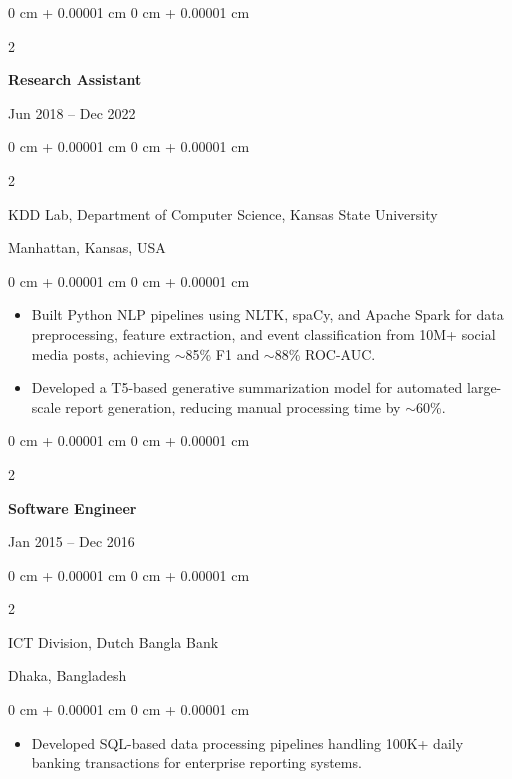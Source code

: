 \documentclass[10pt, letterpaper]{article}
\newenvironment{highlights}{
    \begin{itemize}[
        topsep=0.10 cm,
        parsep=0.10 cm,
        partopsep=0pt,
        itemsep=0pt,
        leftmargin=0 cm + 10pt
    ]
}{
    \end{itemize}
} %
\newenvironment{onecolentry}{
    \begin{adjustwidth}{
        0 cm + 0.00001 cm
    }{
        0 cm + 0.00001 cm
    }
}{
    \end{adjustwidth}
} %
\newenvironment{twocolentry}[2][]{
    \onecolentry
    \def\secondColumn{#2}
    \setcolumnwidth{\fill, 4.5 cm}
    \begin{paracol}{2}
}{
    \switchcolumn \raggedleft \secondColumn
    \end{paracol}
    \endonecolentry
} %
\begin{document}
    \vspace{1mm}

    \begin{twocolentry}{Jun 2018 -- Dec 2022}
        \textbf{Research Assistant}
    \end{twocolentry}
    \begin{twocolentry}{Manhattan, Kansas, USA}
       KDD Lab, Department of Computer Science, Kansas State University
    \end{twocolentry}
    \vspace{0.10 cm}
    \begin{onecolentry}
        \begin{highlights}
            \item Built Python NLP pipelines using NLTK, spaCy, and Apache Spark for data preprocessing, feature extraction, and event classification from 10M+ social media posts, achieving $\sim$85\% F1 and $\sim$88\% ROC-AUC.
            \item Developed a T5-based generative summarization model for automated large-scale report generation, reducing manual processing time by $\sim$60\%.
        \end{highlights}
    \end{onecolentry}

    \vspace{0.1 cm}
    \begin{twocolentry}{Jan 2015 -- Dec 2016}
        \textbf{Software Engineer}
    \end{twocolentry}
    \begin{twocolentry}{Dhaka, Bangladesh}
       ICT Division, Dutch Bangla Bank
    \end{twocolentry}

    \begin{onecolentry}
        \begin{highlights}
            \item Developed SQL-based data processing pipelines handling 100K+ daily banking transactions for enterprise reporting systems.
        \end{highlights}
    \end{onecolentry}

\end{document}
